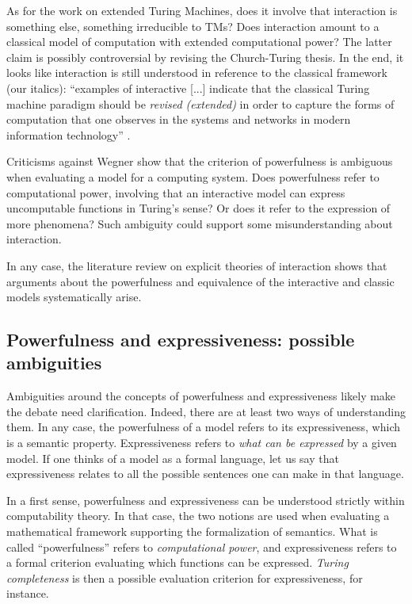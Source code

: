 \documentclass[a4paper, 11pt, twoside]{article}
\begin{document}
As for the work on extended Turing Machines, does it involve that interaction is something else, something irreducible to TMs? Does interaction amount to a classical model of computation with extended computational power? The latter claim is possibly controversial by revising the Church-Turing thesis. In the end, it looks like interaction is still understood in reference to the classical framework (our italics):  ``examples of interactive [...] indicate that the classical Turing machine paradigm should be \textit{revised (extended)} in order to capture the forms of computation that one observes in the systems and networks in modern information technology'' \parencite{VanLeeuwen2000}. 

Criticisms against Wegner show that the criterion of powerfulness is ambiguous when evaluating a model for a computing system. Does powerfulness refer to computational power, involving that an interactive model can express uncomputable functions in Turing’s sense? Or does it refer to the expression of more phenomena? Such ambiguity could support some misunderstanding about interaction.  

In any case, the literature review on explicit theories of interaction shows that arguments about the powerfulness and equivalence of the interactive and classic models systematically arise. 

\subsection{Powerfulness and expressiveness: possible ambiguities}

Ambiguities around the concepts of powerfulness and expressiveness likely make the debate need clarification. Indeed, there are at least two ways of understanding them. 
In any case, the powerfulness of a model refers to its expressiveness, which is a semantic property. 
Expressiveness refers to \textit{what can be expressed} by a given model.
If one thinks of a model as a formal language, let us say that expressiveness relates to all the possible sentences one can make in that language. 

In a first sense, powerfulness and expressiveness can be understood strictly within computability theory.
In that case, the two notions are used when evaluating a mathematical framework supporting the formalization of semantics. What is called ``powerfulness'' refers to \textit{computational power}, and expressiveness refers to a formal criterion evaluating which functions can be expressed. \textit{Turing completeness} is then a possible evaluation criterion for expressiveness, for instance.
\end{document}
